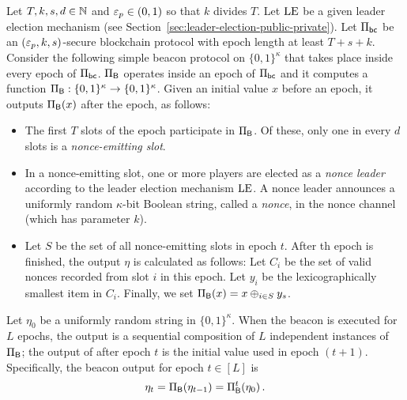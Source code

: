 \begin{definition}\label{def:new-beacon}
  Let $T, k, s,d \in \mathbb{N}$ and $\mathsf{\varepsilon}_p \in (0,1)$ 
  so that $k$ divides $T$.
  Let $\mathrm{LE}$ be a given leader election mechanism 
  (see Section~\ref{sec:leader-election-public-private}).
  Let $\Pi_\mathsf{bc}$ be an $(\mathsf{\varepsilon}_p, k, s)$-secure blockchain protocol 
  with epoch length at least $T + s + k$. 
  Consider the following simple beacon protocol on $\{0,1\}^\kappa$ 
  that takes place inside every epoch of $\Pi_\mathsf{bc}$. 
  $\Pi_{\mathsf{B}}$ operates inside an epoch of $\Pi_\mathsf{bc}$ 
  and it computes a function 
  $\Pi_{\mathsf{B}} : \{0,1\}^\kappa \rightarrow \{0,1\}^\kappa$. 
  Given an initial value $x$ before an epoch, 
  it outputs $\Pi_{\mathsf{B}}(x)$ 
  after the epoch, as follows:
  \begin{itemize}
    \item The first $T$ slots of the epoch participate in $\Pi_{\mathsf{B}}$. 
    Of these, only one in every $d$ slots is a \emph{nonce-emitting slot}. 

    \item In a nonce-emitting slot, one or more players are elected as a \emph{nonce leader} 
    according to the leader election mechanism $\mathrm{LE}$.
    A nonce leader announces a uniformly random $\kappa$-bit Boolean string, 
    called a \emph{nonce},  
    in the nonce channel (which has parameter $k$). 

    \item 
    Let $S$ be the set of all nonce-emitting slots in epoch $t$.
    After th epoch is finished, the output $\eta$ is calculated as follows:
    Let $C_i$ be the set of valid nonces recorded from slot $i$ in this epoch. 
    Let $y_i$ be the lexicographically smallest item in $C_i$.
    Finally, we set $\Pi_{\mathsf{B}}(x) = x \oplus_{i \in S} y_s$.
  \end{itemize}
  Let $\eta_0$ be a uniformly random string in $\{0,1\}^\kappa$. 
  When the beacon is executed for $L$ epochs, 
  the output is a sequential composition of 
  $L$ independent instances of $\Pi_{\mathsf{B}}$; 
  the output of after epoch $t$ is the initial value used in epoch $(t+1)$. 
  Specifically, 
  the beacon output for epoch $t \in [L]$ is 
  \begin{align}%
    \eta_t = \Pi_\Beacon(\eta_{t-1}) = \Pi_\Beacon^t(\eta_0)\,.
  \end{align}
\end{definition}






